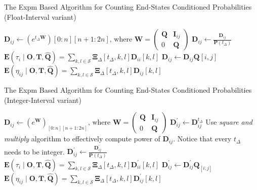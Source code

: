 \documentclass[thesis=M,english]{FITthesis}[2012/10/20]
\newcommand{\matr}[1]{\mathbf{#1}}
\begin{document}
\begin{algorithm}[h]
\caption{The Expm Based Algorithm for Counting End-States Conditioned Probabilities (Float-Interval variant)}\label{fv}
\begin{algorithmic}[1]
\ForAll{$t_{\Delta} \in \matr{T}_{\Delta}$}
	\State $\matr{D}_{ij} \gets (e^{t_{\Delta} \matr{W}}){[0:n][n+1:2n]}\text{, where } \matr{W} = \begin{pmatrix} \matr{Q} & \matr{I}_{ij} \\ 0 & \matr{Q} \end{pmatrix} $
	\State $\matr{D}_{ij} \gets \frac{ \matr{D}_{ij} }{\matr{P}({t_{\Delta}})}$ 
	 \State $\mathbf{E}(\tau_{i} \mid \matr{O}, \matr{T}, \matr{ \hat Q }) = \sum_{k,l \in \mathcal{S}} \matr{\Xi}_{\Delta}[t_{\Delta},k,l] \matr{D}_{ii}[k,l]$  
	\Else 
	 \State $\matr{D}_{ij} \gets  \matr{D}_{ij} \matr{Q}{[i,j]}$
	 \State $\mathbf{E}(\eta_{ij} \mid \matr{O}, \matr{T}, \matr{ \hat Q } ) = \sum_{k,l \in \mathcal{S}} \matr{\Xi}_{\Delta}[t_{\Delta},k,l] \matr{D}_{ij}[k,l]$ 
  	\EndIf 
 
 \EndFor
\EndFor
\EndProcedure
\end{algorithmic}
\end{algorithm}

\begin{algorithm}[h]
\caption{The Expm Based Algorithm for Counting End-States Conditioned Probabilities (Integer-Interval variant)}\label{iv}
\begin{algorithmic}[1]
	\State $\matr{D}_{ij} \gets (e^{\matr{W}})_{[0:n][n+1:2n]}\text{, where } \matr{W} = \begin{pmatrix} \matr{Q} & \matr{I}_{ij} \\ 0 & \matr{Q} \end{pmatrix} $
 \EndFor
\ForAll{$t_{\Delta} \in \matr{T}_{\Delta}$}
    \State $\matr{D}_{ij}^{'} \gets  \matr{D}_{ij}^{t_{\Delta}} $
    \Comment Use \textit{square and multiply} algorithm to effectively compute	power of $\matr{D}_{ij}$. Notice that every $t_{\Delta}$ needs to be integer.
	\State $\matr{D}_{ij}^{'} \gets \frac{ \matr{D}_{ij}^{'} }{\matr{P}({t_{\Delta}})}$ 
	 \State $\mathbf{E}(\tau_{i} \mid \matr{O}, \matr{T}, \matr{ \hat Q }) = \sum_{k,l \in \mathcal{S}} \matr{\Xi}_{\Delta}[t_{\Delta},k,l] \matr{D}_{ii}^{'}[k,l]$  
	\Else 
	 \State $\matr{D}^{'}_{ij} \gets  \matr{D}_{ij}^{'} \matr{Q}_{[i,j]}$
	 \State $\mathbf{E}(\eta_{ij} \mid \matr{O}, \matr{T}, \matr{ \hat Q } ) = \sum_{k,l \in \mathcal{S}} \matr{\Xi}_{\Delta}[t_{\Delta},k,l] \matr{D}^{'}_{ij}[k,l]$ 
  	\EndIf 
  \EndFor
\EndFor
\EndProcedure
\end{algorithmic}
\end{algorithm}
\end{document}
